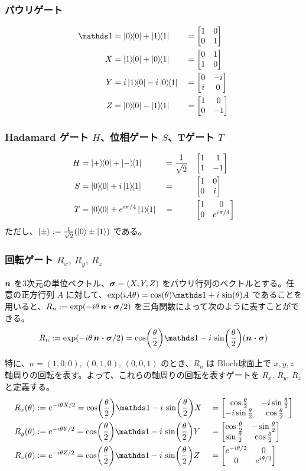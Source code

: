 \subsubsection{パウリゲート}
\begin{alignat}{3}
    \bbid &= \dyad{0} + \dyad{1}               &&= \paulii \\
    X &= \dyad{1}{0} + \dyad{0}{1}   &&= \paulix \\
    Y &= i\dyad{1}{0} - i\dyad{0}{1} &&= \pauliy \\
    Z &= \dyad{0} - \dyad{1}               &&= \pauliz
\end{alignat}

\subsubsection{Hadamard ゲート $H$、位相ゲート $S$、Tゲート $T$}
\begin{alignat}{5}
    H &= \dyad{+}{0} + \dyad{-}{1} &&= \frac{1}{\sqrt{2}}&&\mqty[1 & 1 \\ 1 & -1] \\
    S &= \dyad{0}{0} + i\dyad{1}{1} &&= &&\mqty[1 & 0 \\ 0 & i] \\
    T &= \dyad{0}{0} + e^{i\pi/4}\dyad{1}{1} &&= &&\mqty[1 & 0 \\ 0 & e^{i\pi/4}]
\end{alignat}
ただし、$\ket{\pm} := \frac{1}{\sqrt{2}}(\ket{0} \pm \ket{1})$ である。

\subsubsection{回転ゲート $R_x,\,R_y,\,R_z$}
$\boldsymbol{n}$ を3次元の単位ベクトル、$\boldsymbol{\sigma} = (X,Y,Z)$ をパウリ行列のベクトルとする。任意の正方行列 $A$ に対して、$\exp(iA\th) = \cos(\th)\bbid + i\,\sin(\th)A$ であることを用いると、$R_n := \exp(-i\theta\,\boldsymbol{n\cdot\sigma}/2)$ を三角関数によって次のように表すことができる。
\begin{align}
    R_n := \exp(-i\th\,\bs{n\cdot\sigma}/2) = \cos(\frac{\th}{2})\bbid - i\,\sin(\frac{\th}{2})(\bs{n\cdot\sigma})
\end{align}

特に、$n = (1,0,0),\,(0,1,0),\,(0,0,1)$ のとき、$R_n$ は Bloch球面上で $x, y, z$ 軸周りの回転を表す。よって、これらの軸周りの回転を表すゲートを $R_x,\,R_y,\,R_z$ と定義する。
\begin{alignat}{3}
    R_x(\th) &:= e^{-i\th X/2} = \cos(\frac{\th}{2})\bbid -i\,\sin(\frac{\th}{2})X &&=  \rx{\th}\\
    R_y(\th) &:= e^{-i\th Y/2} = \cos(\frac{\th}{2})\bbid -i\,\sin(\frac{\th}{2})Y &&=  \ry{\th}\\
    R_z(\th) &:= e^{-i\th Z/2} = \cos(\frac{\th}{2})\bbid -i\,\sin(\frac{\th}{2})Z &&=  \rz{\th}
\end{alignat}

